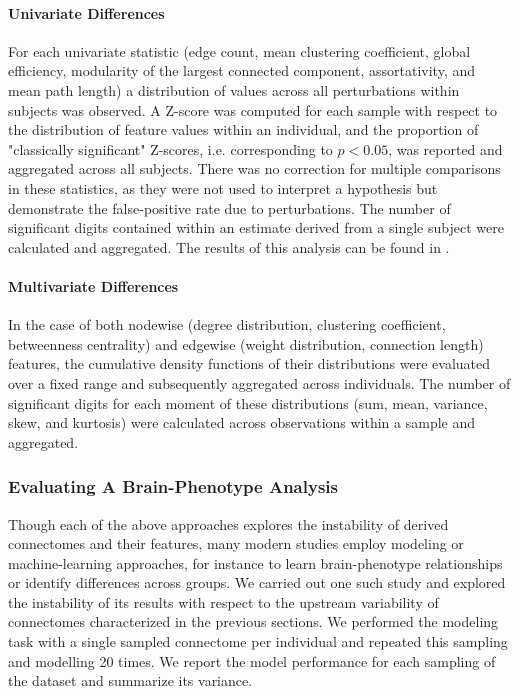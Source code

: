 \documentclass[fleqn,10pt]{SelfArx} %
\newcommand{\new}[1]{{#1}}
\begin{document}
\paragraph{Univariate Differences} For each univariate statistic (edge count, mean clustering coefficient, global
efficiency, modularity of the largest connected component, assortativity, and mean path length) a distribution of
values across all perturbations within subjects was observed. A Z-score was computed for each sample with respect to
the distribution of feature values within an individual, and the proportion of "classically significant" Z-scores, i.e.
corresponding to $p < 0.05$, was reported and aggregated across all subjects. \new{There was no correction for multiple
comparisons in these statistics, as they were not used to interpret a hypothesis but demonstrate the false-positive
rate due to perturbations.} The number of significant digits
contained within an estimate derived from a single subject were calculated and aggregated. \new{The results of this
analysis can be found in \sref{supsec:univar}}.

\paragraph{Multivariate Differences} In the case of both nodewise (degree distribution, clustering coefficient,
betweenness centrality) and edgewise (weight distribution, connection length) features, the cumulative density
functions of their distributions were evaluated over a fixed range and subsequently aggregated across individuals. The
number of significant digits for each moment of these distributions (sum, mean, variance, skew, and kurtosis) were
calculated across observations within a sample and aggregated.

\subsubsection*{Evaluating A Brain-Phenotype Analysis}
Though each of the above approaches explores the instability of derived connectomes and their features, many modern
studies employ modeling or machine-learning approaches, for instance to learn brain-phenotype relationships or identify
differences across groups. We carried out one such study and explored the instability of its results with respect to
the upstream variability of connectomes characterized in the previous sections. We performed the modeling task with a
single sampled connectome per individual and repeated this sampling and modelling 20 times. We report the model
performance for each sampling of the dataset and summarize its variance.
\end{document}
